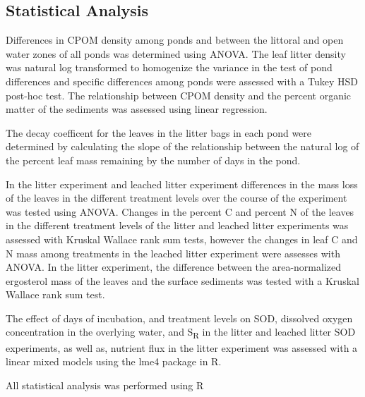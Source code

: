 \subsection{Statistical Analysis}

Differences in CPOM density among ponds and between the littoral and open water zones of all ponds was determined using ANOVA. The leaf litter density was natural log transformed to homogenize the variance in the test of pond differences and specific differences among ponds were assessed with a Tukey HSD post-hoc test. The relationship between CPOM density and the percent organic matter of the sediments was assessed using linear regression.

The decay coefficent for the leaves in the litter bags in each pond were determined by calculating the slope of the relationship between the natural log of the percent leaf mass remaining by the number of days in the pond.

In the litter experiment and leached litter experiment differences in the mass loss of the leaves in the different treatment levels over the course of the experiment was tested using ANOVA. Changes in the percent C and percent N of the leaves in the different treatment levels of the litter and leached litter experiments was assessed with Kruskal Wallace rank sum tests, however the changes in leaf C and N mass among treatments in the leached litter experiment were assesses with ANOVA. In the litter experiment, the difference between the area-normalized ergosterol mass of the leaves and the surface sediments was tested with a Kruskal Wallace rank sum test.

The effect of days of incubation, and treatment levels on SOD, dissolved oxygen concentration in the overlying water,  and S\textsubscript{R} in the litter and leached litter SOD experiments, as well as, nutrient flux in the litter experiment was assessed with a linear mixed models using the lme4 package \cite{lme4} in R.

All statistical analysis was performed using R \cite{R}


